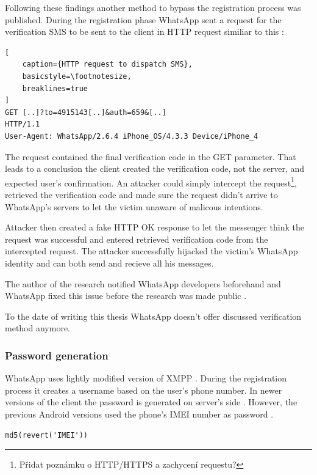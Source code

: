 \documentclass[thesis=M,english]{FITthesis}[2012/10/20]
\begin{document}
Following these findings another method to bypass the registration process was published. During the registration phase WhatsApp sent a request for the verification SMS to be sent to the client in HTTP request similiar to this \cite{whatsapp-shootingthemsg}:


\begin{lstlisting}[
	caption={HTTP request to dispatch SMS},
	basicstyle=\footnotesize,
	breaklines=true
]
GET [..]?to=4915143[..]&auth=659&[..]
HTTP/1.1
User-Agent: WhatsApp/2.6.4 iPhone_OS/4.3.3 Device/iPhone_4
\end{lstlisting}

The request contained the final verification code in the GET parameter. That leads to a conclusion the client created the verification code, not the server, and expected user's confirmation. An attacker could simply intercept the request\footnote{Přidat poznámku o HTTP/HTTPS a zachycení requestu?}, retrieved the verification code and made sure the request didn't arrive to WhatsApp's servers to let the victim unaware of malicous intentions.

Attacker then created a fake HTTP OK response to let the messenger think the request was successful and entered retrieved verification code from the intercepted request. The attacker successfully hijacked the victim's WhatsApp identity and can both send and recieve all his messages.

The author of the research notified WhatsApp developers beforehand and WhatsApp fixed this issue before the research was made public \cite{whatsapp-shootingthemsg}.

To the date of writing this thesis WhatsApp doesn't offer discussed verification method anymore.


\subsubsection{Password generation}

WhatsApp uses lightly modified version of XMPP \cite{whatsapp-xmpp}. During the registration process it creates a username based on the user's phone number. In newer versions of the client the password is generated on server's side \cite{whatsapp-imei}. However, the previous Android versions used the phone's IMEI  number as password \cite{whatsapp-imei}\cite{whatsapp-imei2}.

\begin{lstlisting}[caption={Pseudo-code of password generation on Android}]
md5(revert('IMEI')) 
\end{lstlisting}
\end{document}
